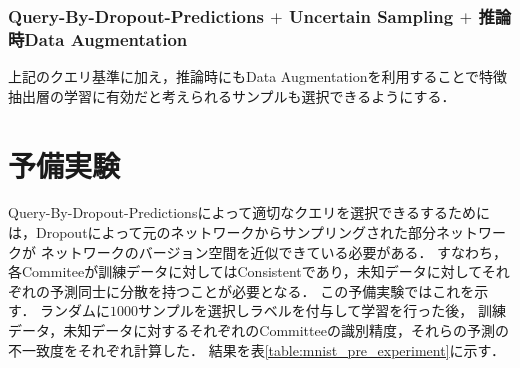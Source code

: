 \subsubsection{Query-By-Dropout-Predictions $+$ Uncertain Sampling $+$ 推論時Data Augmentation}
上記のクエリ基準に加え，推論時にもData Augmentationを利用することで特徴抽出層の学習に有効だと考えられるサンプルも選択できるようにする．


\section{予備実験}
Query-By-Dropout-Predictionsによって適切なクエリを選択できるするためには，Dropoutによって元のネットワークからサンプリングされた部分ネットワークが
ネットワークのバージョン空間を近似できている必要がある．
すなわち，各Commiteeが訓練データに対してはConsistentであり，未知データに対してそれぞれの予測同士に分散を持つことが必要となる．
この予備実験ではこれを示す．
ランダムに$1000$サンプルを選択しラベルを付与して学習を行った後，
訓練データ，未知データに対するそれぞれのCommitteeの識別精度，それらの予測の不一致度をそれぞれ計算した．
結果を表\ref{table:mnist_pre_experiment}に示す．

